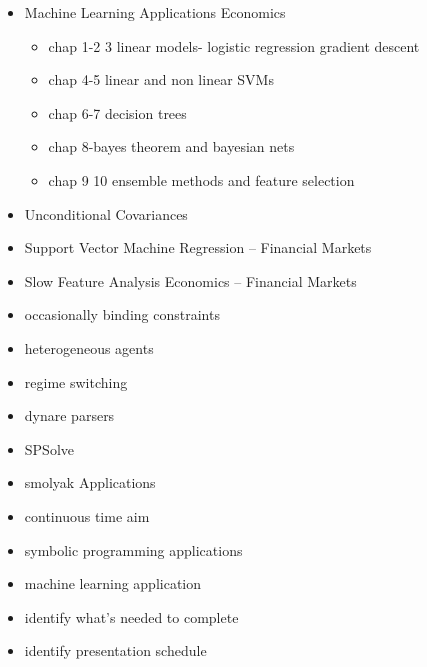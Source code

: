\documentclass[hyperref]{labbook}
\begin{document}
\begin{description}
\begin{itemize}
\begin{itemize}
\item Machine Learning Applications Economics  \
  \begin{itemize}
  \item chap 1-2 3 linear models- logistic regression gradient descent 
  \item chap 4-5 linear and non linear SVMs  
  \item chap 6-7 decision trees  
  \item chap 8-bayes theorem and bayesian nets  
  \item chap 9 10 ensemble methods and feature selection  
  \end{itemize}
\item Unconditional Covariances 
\item Support Vector Machine Regression -- Financial Markets  
\item Slow Feature Analysis Economics -- Financial Markets  
\item occasionally binding constraints  
\item heterogeneous agents  
\item regime switching  
\item dynare parsers 
\item SPSolve  
\item smolyak Applications  
\item continuous time aim  
\item symbolic programming applications  
\item machine learning application  
\end{itemize}
    \end{itemize}
\end{description}

\begin{itemize}
\item {identify what's needed to complete}


\item {identify presentation schedule}
\end{itemize}


\end{document}
